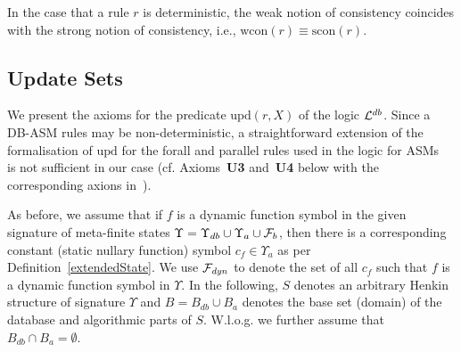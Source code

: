 \documentclass[preprint,11pt]{elsarticle}
\theoremstyle{definition}
\theoremstyle{remark}
\begin{document}
In the case that a rule $r$ is deterministic, the weak notion of
consistency coincides with the strong notion of consistency, i.e.,
$\mathrm{wcon}(r) \equiv \mathrm{scon}(r)$.



\subsection{Update Sets}\label{sub:UpdateSets}

We present the axioms for the predicate $\mathrm{upd}(r,X)$ of the logic ${\cal L}^{db}$. Since a DB-ASM rules may be non-deterministic, a straightforward extension of the formalisation of $\mathrm{upd}$ for the forall and parallel rules used in the logic for ASMs~\cite{RobertLogicASM} is not sufficient in our case (cf. Axioms~\textbf{U3} and~\textbf{U4} below with the corresponding axions in~\cite{RobertLogicASM}). 

As before, we assume that if $f$ is a dynamic function symbol in the given signature of meta-finite states $\Upsilon = \Upsilon_{db} \cup \Upsilon_a \cup {\cal F}_b$, then there is a corresponding constant (static nullary function) symbol $c_f \in \Upsilon_a$ as per Definition~\ref{extendedState}. We use ${\cal F}_{\mathit{dyn}}$ to denote the set of all $c_f$ such that $f$ is a dynamic function symbol in $\Upsilon$. In the following, $S$ denotes an arbitrary Henkin structure of signature $\Upsilon$ and $B=B_{db}\cup B_a$ denotes the base set (domain) of the database and algorithmic parts of $S$. W.l.o.g. we further assume that $B_{db} \cap B_a = \emptyset$. 
\end{document}
